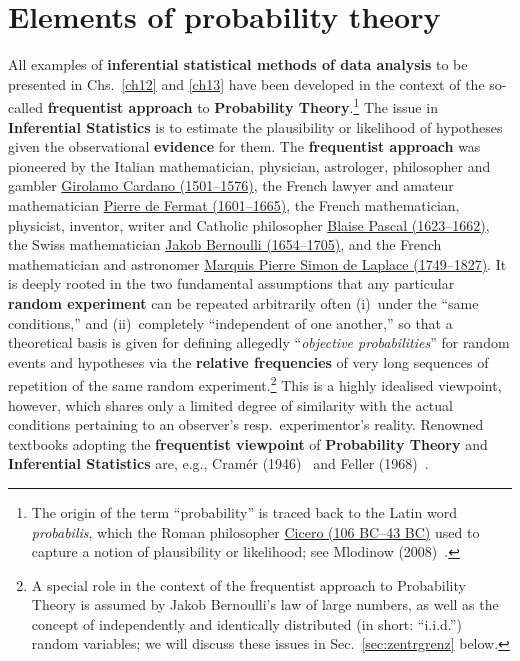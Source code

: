 \chapter[Elements of probability theory]{Elements of probability
theory}
All examples of \textbf{inferential statistical methods of data 
analysis} to be presented in Chs.~\ref{ch12} and \ref{ch13} have 
been developed in the context of the so-called \textbf{frequentist 
approach} to \textbf{Probability Theory}.\footnote{The origin of
the term ``probability'' is traced back to the Latin word 
\textit{probabilis}, which the Roman philosopher 
\href{https://en.wikipedia.org/wiki/Cicero}{Cicero (106 BC--43 
BC)} used to capture a notion of plausibility or likelihood; see 
Mlodinow (2008)~.} The issue in
\textbf{Inferential Statistics} is to estimate the plausibility or
likelihood of hypotheses given the observational \textbf{evidence}
for them. The \textbf{frequentist approach} was pioneered by the
Italian mathematician, physician, astrologer, philosopher and
gambler 
\href{http://www-history.mcs.st-and.ac.uk/Biographies/Cardan.html}{Girolamo Cardano (1501--1576)}, the French lawyer and amateur mathematician  
\href{http://www-history.mcs.st-and.ac.uk/Biographies/Fermat.html}{Pierre
de Fermat (1601--1665)}, the French mathematician, 
physicist, inventor, writer and Catholic philosopher 
\href{http://www-history.mcs.st-and.ac.uk/Biographies/Pascal.html}{Blaise Pascal (1623--1662)}, the Swiss mathematician
\href{http://www-history.mcs.st-and.ac.uk/Biographies/Bernoulli_Jacob.html}{Jakob Bernoulli (1654--1705)}, and the French 
mathematician and astronomer
\href{http://www-history.mcs.st-and.ac.uk/Biographies/Laplace.html}{Marquis Pierre Simon de Laplace (1749--1827)}. It is deeply 
rooted in the two fundamental assumptions that any particular 
\textbf{random experiment} can be repeated arbitrarily often 
(i)~under the ``same conditions,'' and (ii)~completely 
``independent of one another,'' so that a theoretical basis is 
given for defining allegedly ``\textit{objective probabilities}''
for random events and hypotheses via the \textbf{relative
frequencies} of very long sequences of repetition of the same
random experiment.\footnote{A special role in the context of the
frequentist approach to Probability Theory is assumed by Jakob
Bernoulli's law of large numbers, as well as the concept of
independently and identically distributed 
(in short: ``i.i.d.'') random variables; we will discuss these 
issues in Sec.~\ref{sec:zentrgrenz} below.} This is a highly 
idealised viewpoint, however, which shares only a limited degree 
of similarity with the actual conditions pertaining to an 
observer's resp.~experimentor's reality. Renowned textbooks 
adopting the \textbf{frequentist viewpoint} of \textbf{Probability
Theory} and  \textbf{Inferential Statistics} are, e.g., Cram\'{e}r 
(1946)~ and Feller (1968)~.

